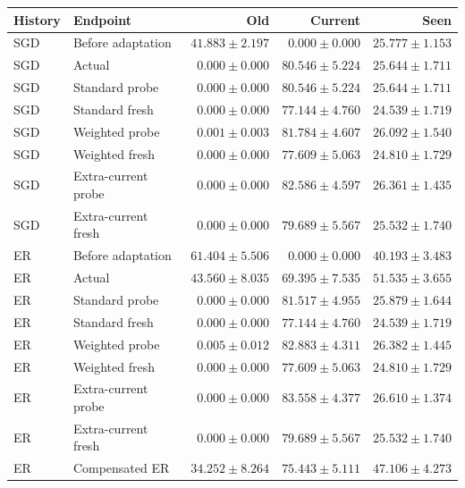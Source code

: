 \begin{tabular}{llrrr}
\toprule
History & Endpoint & Old & Current & Seen \\
\midrule
SGD & Before adaptation & $41.883 \pm 2.197$ & $0.000 \pm 0.000$ & $25.777 \pm 1.153$ \\
SGD & Actual & $0.000 \pm 0.000$ & $80.546 \pm 5.224$ & $25.644 \pm 1.711$ \\
SGD & Standard probe & $0.000 \pm 0.000$ & $80.546 \pm 5.224$ & $25.644 \pm 1.711$ \\
SGD & Standard fresh & $0.000 \pm 0.000$ & $77.144 \pm 4.760$ & $24.539 \pm 1.719$ \\
SGD & Weighted probe & $0.001 \pm 0.003$ & $81.784 \pm 4.607$ & $26.092 \pm 1.540$ \\
SGD & Weighted fresh & $0.000 \pm 0.000$ & $77.609 \pm 5.063$ & $24.810 \pm 1.729$ \\
SGD & Extra-current probe & $0.000 \pm 0.000$ & $82.586 \pm 4.597$ & $26.361 \pm 1.435$ \\
SGD & Extra-current fresh & $0.000 \pm 0.000$ & $79.689 \pm 5.567$ & $25.532 \pm 1.740$ \\
\midrule
ER & Before adaptation & $61.404 \pm 5.506$ & $0.000 \pm 0.000$ & $40.193 \pm 3.483$ \\
ER & Actual & $43.560 \pm 8.035$ & $69.395 \pm 7.535$ & $51.535 \pm 3.655$ \\
ER & Standard probe & $0.000 \pm 0.000$ & $81.517 \pm 4.955$ & $25.879 \pm 1.644$ \\
ER & Standard fresh & $0.000 \pm 0.000$ & $77.144 \pm 4.760$ & $24.539 \pm 1.719$ \\
ER & Weighted probe & $0.005 \pm 0.012$ & $82.883 \pm 4.311$ & $26.382 \pm 1.445$ \\
ER & Weighted fresh & $0.000 \pm 0.000$ & $77.609 \pm 5.063$ & $24.810 \pm 1.729$ \\
ER & Extra-current probe & $0.000 \pm 0.000$ & $83.558 \pm 4.377$ & $26.610 \pm 1.374$ \\
ER & Extra-current fresh & $0.000 \pm 0.000$ & $79.689 \pm 5.567$ & $25.532 \pm 1.740$ \\
ER & Compensated ER & $34.252 \pm 8.264$ & $75.443 \pm 5.111$ & $47.106 \pm 4.273$ \\
\bottomrule
\end{tabular}
